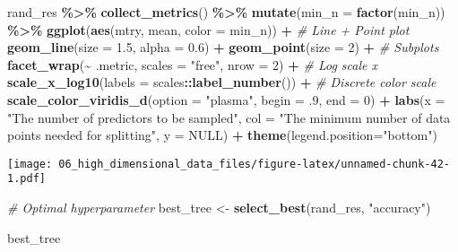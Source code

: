 \documentclass[
]{book}
\newenvironment{Shaded}{\begin{snugshade}}{\end{snugshade}}
\newcommand{\CommentTok}[1]{\textcolor[rgb]{0.56,0.35,0.01}{\textit{#1}}}
\newcommand{\DataTypeTok}[1]{\textcolor[rgb]{0.13,0.29,0.53}{#1}}
\newcommand{\DecValTok}[1]{\textcolor[rgb]{0.00,0.00,0.81}{#1}}
\newcommand{\FloatTok}[1]{\textcolor[rgb]{0.00,0.00,0.81}{#1}}
\newcommand{\KeywordTok}[1]{\textcolor[rgb]{0.13,0.29,0.53}{\textbf{#1}}}
\newcommand{\NormalTok}[1]{#1}
\newcommand{\OperatorTok}[1]{\textcolor[rgb]{0.81,0.36,0.00}{\textbf{#1}}}
\newcommand{\OtherTok}[1]{\textcolor[rgb]{0.56,0.35,0.01}{#1}}
\newcommand{\StringTok}[1]{\textcolor[rgb]{0.31,0.60,0.02}{#1}}
\begin{document}
\begin{Shaded}
\begin{Highlighting}[]
\NormalTok{rand\_res }\OperatorTok{\%\textgreater{}\%}
\StringTok{  }\KeywordTok{collect\_metrics}\NormalTok{() }\OperatorTok{\%\textgreater{}\%}
\StringTok{  }\KeywordTok{mutate}\NormalTok{(}\DataTypeTok{min\_n =} \KeywordTok{factor}\NormalTok{(min\_n)) }\OperatorTok{\%\textgreater{}\%}
\StringTok{  }\KeywordTok{ggplot}\NormalTok{(}\KeywordTok{aes}\NormalTok{(mtry, mean, }\DataTypeTok{color =}\NormalTok{ min\_n)) }\OperatorTok{+}
\StringTok{  }\CommentTok{\# Line + Point plot }
\StringTok{  }\KeywordTok{geom\_line}\NormalTok{(}\DataTypeTok{size =} \FloatTok{1.5}\NormalTok{, }\DataTypeTok{alpha =} \FloatTok{0.6}\NormalTok{) }\OperatorTok{+}
\StringTok{  }\KeywordTok{geom\_point}\NormalTok{(}\DataTypeTok{size =} \DecValTok{2}\NormalTok{) }\OperatorTok{+}
\StringTok{  }\CommentTok{\# Subplots }
\StringTok{  }\KeywordTok{facet\_wrap}\NormalTok{(}\OperatorTok{\textasciitilde{}}\StringTok{ }\NormalTok{.metric, }
             \DataTypeTok{scales =} \StringTok{"free"}\NormalTok{, }
             \DataTypeTok{nrow =} \DecValTok{2}\NormalTok{) }\OperatorTok{+}
\StringTok{  }\CommentTok{\# Log scale x }
\StringTok{  }\KeywordTok{scale\_x\_log10}\NormalTok{(}\DataTypeTok{labels =}\NormalTok{ scales}\OperatorTok{::}\KeywordTok{label\_number}\NormalTok{()) }\OperatorTok{+}
\StringTok{  }\CommentTok{\# Discrete color scale }
\StringTok{  }\KeywordTok{scale\_color\_viridis\_d}\NormalTok{(}\DataTypeTok{option =} \StringTok{"plasma"}\NormalTok{, }\DataTypeTok{begin =} \FloatTok{.9}\NormalTok{, }\DataTypeTok{end =} \DecValTok{0}\NormalTok{) }\OperatorTok{+}
\StringTok{  }\KeywordTok{labs}\NormalTok{(}\DataTypeTok{x =} \StringTok{"The number of predictors to be sampled"}\NormalTok{,}
       \DataTypeTok{col =} \StringTok{"The minimum number of data points needed for splitting"}\NormalTok{,}
       \DataTypeTok{y =} \OtherTok{NULL}\NormalTok{) }\OperatorTok{+}
\StringTok{  }\KeywordTok{theme}\NormalTok{(}\DataTypeTok{legend.position=}\StringTok{"bottom"}\NormalTok{)}
\end{Highlighting}
\end{Shaded}

\texttt{[image: 06\_high\_dimensional\_data\_files/figure-latex/unnamed-chunk-42-1.pdf]}

\begin{Shaded}
\begin{Highlighting}[]
\CommentTok{\# Optimal hyperparameter}
\NormalTok{best\_tree \textless{}{-}}\StringTok{ }\KeywordTok{select\_best}\NormalTok{(rand\_res, }\StringTok{"accuracy"}\NormalTok{)}

\NormalTok{best\_tree}
\end{Highlighting}
\end{Shaded}
\end{document}
